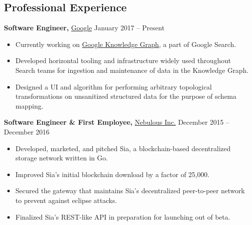 \documentclass[margin]{res}
\begin{document}
\begin{minipage}{\textwidth}


\begin{resume}

\section{Professional Experience}
{\bf Software Engineer,} \uline{Google} \hfill January 2017 -- Present
 \begin{itemize} \itemsep -2pt %
 \item Currently working on \uline{\href{https://blog.google/products/search/introducing-knowledge-graph-things-not/}{Google Knowledge Graph}}, a part of Google Search.
 \item Developed horizontal tooling and infrastructure widely used throughout Search teams for ingestion and maintenance of data in the Knowledge Graph.
 \item Designed a UI and algorithm for performing arbitrary topological transformations on unsanitized structured data for the purpose of schema mapping.
 \end{itemize}



{\bf Software Engineer \& First Employee,} \uline{Nebulous Inc.} \hfill December 2015 -- December 2016
 \begin{itemize} \itemsep -2pt %
 \item Developed, marketed, and pitched Sia, a blockchain-based decentralized storage network written in Go.
 \item Improved Sia's initial blockchain download by a factor of 25,000.
 \item Secured the gateway that maintains Sia's decentralized peer-to-peer network to prevent against eclipse attacks.
 \item Finalized Sia's REST-like API in preparation for launching out of beta.
 \end{itemize}




\end{resume}
\end{minipage}
\end{document}
